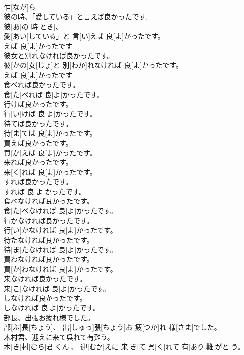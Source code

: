 \documentclass[8pt]{extreport}
\begin{document}
\begin{CJK}{UTF8}{min}
\\	乍[なが]ら 
\\	彼の時、「愛している」と言えば良かったです。	
\\	彼[あ]の 時[とき]、
\\	愛[あい]している」と 言[い]えば 良[よ]かったです。 
\\	えば 良[よ]かったです 
\\	彼女と別れなければ良かったです。	
\\	彼[かの]女[じょ]と 別[わか]れなければ 良[よ]かったです。 
\\	えば 良[よ]かったです 
\\	食べれば良かったです。	
\\	食[た]べれば 良[よ]かったです。
\\	行けば良かったです。	
\\	行[い]けば 良[よ]かったです。
\\	待てば良かったです。	
\\	待[ま]てば 良[よ]かったです。
\\	買えば良かったです。	
\\	買[か]えば 良[よ]かったです。
\\	来れば良かったです。	
\\	来[く]れば 良[よ]かったです。
\\	すれば良かったです。	
\\	すれば 良[よ]かったです。
\\	食べなければ良かったです。	
\\	食[た]べなければ 良[よ]かったです。
\\	行かなければ良かったです。	
\\	行[い]かなければ 良[よ]かったです。
\\	待たなければ良かったです。	
\\	待[ま]たなければ 良[よ]かったです。
\\	買わなければ良かったです。	
\\	買[か]わなければ 良[よ]かったです。
\\	来なければ良かったです。	
\\	来[こ]なければ 良[よ]かったです。
\\	しなければ良かったです。	
\\	しなければ 良[よ]かったです。
\\	部長、出張お疲れ様でした。	
\\	部[ぶ]長[ちょう]、 出[しゅっ]張[ちょう]お 疲[つか]れ 様[さま]でした。
\\	木村君、迎えに来て呉れて有難う。	
\\	木[き]村[むら]君[くん]、 迎[むか]えに 来[き]て 呉[く]れて 有[あり]難[がと]う。

\end{CJK}
\end{document}
